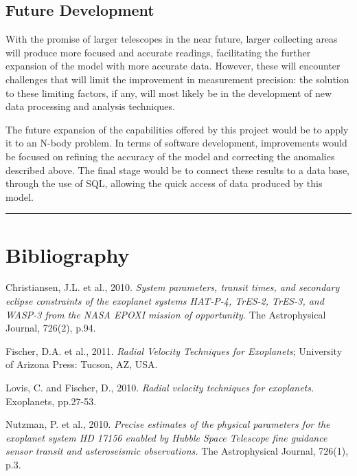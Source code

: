 \documentclass[11pt]{article}
\begin{document}
\hypertarget{future-development}{%
\subsection{Future Development}\label{future-development}}

With the promise of larger telescopes in the near future, larger
collecting areas will produce more focused and accurate readings,
facilitating the further expansion of the model with more accurate data.
However, these will encounter challenges that will limit the improvement
in measurement precision: the solution to these limiting factors, if
any, will most likely be in the development of new data processing and
analysis techniques.

The future expansion of the capabilities offered by this project would
be to apply it to an N-body problem. In terms of software development,
improvements would be focused on refining the accuracy of the model and
correcting the anomalies described above. The final stage would be to
connect these results to a data base, through the use of SQL, allowing
the quick access of data produced by this model.

\newpage

\begin{center}\rule{0.5\linewidth}{0.5pt}\end{center}

\hypertarget{references}{%
\section*{{Bibliography}}\label{references}}

Christiansen, J.L. et al., 2010. \textit{System parameters, transit
times, and secondary eclipse constraints of the exoplanet systems
HAT-P-4, TrES-2, TrES-3, and WASP-3 from the NASA EPOXI mission of
opportunity.} The Astrophysical Journal, 726(2), p.94.

Fischer, D.A. et al., 2011. \textit{Radial Velocity Techniques for Exoplanets}; University of Arizona Press: Tucson, AZ, USA.

Lovis, C. and Fischer, D., 2010. \textit{Radial velocity techniques for
exoplanets.} Exoplanets, pp.27-53.

Nutzman, P. et al., 2010. \textit{Precise estimates of the physical parameters for the exoplanet system HD 17156 enabled by Hubble Space Telescope fine guidance sensor transit and asteroseismic observations.} The Astrophysical Journal, 726(1), p.3.
\end{document}
